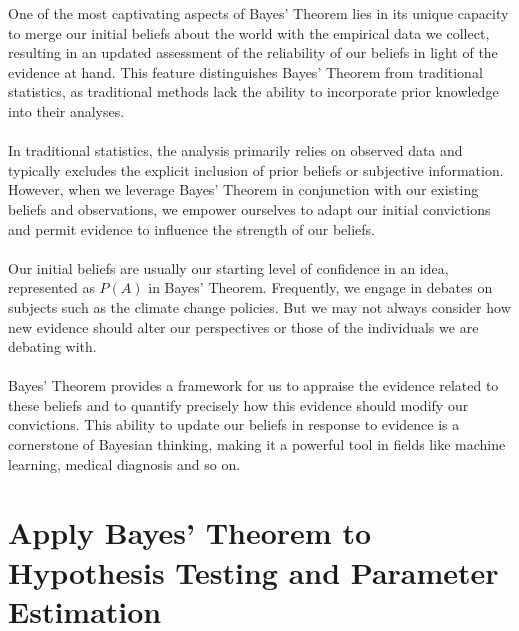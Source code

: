 \documentclass{article}
\begin{document}
One of the most captivating aspects of Bayes' Theorem lies in its unique capacity to merge our initial beliefs about the world with the empirical data we collect, resulting in an updated assessment of the reliability of our beliefs in light of the evidence at hand. This feature distinguishes Bayes' Theorem from traditional statistics, as traditional methods lack the ability to incorporate prior knowledge into their analyses.\\\\
In traditional statistics, the analysis primarily relies on observed data and typically excludes the explicit inclusion of prior beliefs or subjective information. However, when we leverage Bayes' Theorem in conjunction with our existing beliefs and observations, we empower ourselves to adapt our initial convictions and permit evidence to influence the strength of our beliefs.\\\\
Our initial beliefs are usually our starting level of confidence in an idea, represented as \(P(A)\) in Bayes' Theorem. Frequently, we engage in debates on subjects such as the climate change policies. But we may not always consider how new evidence should alter our perspectives or those of the individuals we are debating with.\\\\
Bayes' Theorem provides a framework for us to appraise the evidence related to these beliefs and to quantify precisely how this evidence should modify our convictions. This ability to update our beliefs in response to evidence is a cornerstone of Bayesian thinking, making it a powerful tool in fields like machine learning, medical diagnosis and so on.
\section{Apply Bayes' Theorem to Hypothesis Testing and Parameter Estimation}
\end{document}
